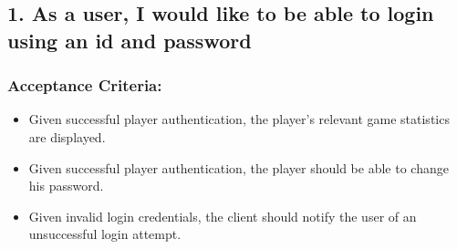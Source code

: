 \subsection*{1. As a user, I would like to be able to login using an id and password}


\subsubsection*{Acceptance Criteria:}

\begin{itemize}
\item Given successful player authentication, the player's relevant game statistics are displayed.
\item Given successful player authentication, the player should be able to change his password.
\item Given invalid login credentials, the client should notify the user of an unsuccessful login attempt.
\end{itemize}
